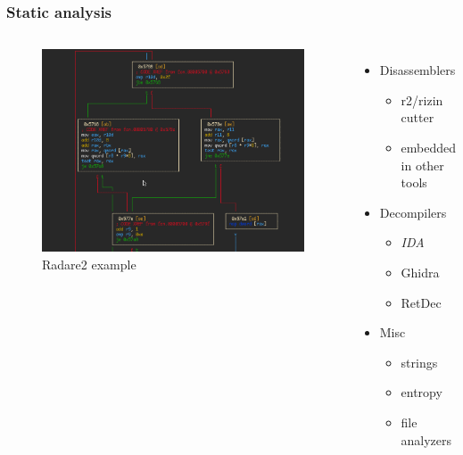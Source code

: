 \documentclass[10pt,xcolor=pdflatex]{beamer}
\begin{document}
\begin{frame}\frametitle{Static analysis}

  \begin{columns}
    \begin{figure}
      \centering
      \includegraphics[width=.8\textwidth]{../images/radare2.png}
      \caption{Radare2 example}
    \end{figure}
    \begin{itemize}
        \item Disassemblers
            \begin{itemize}
                \item r2/rizin cutter
                \item embedded in other tools
            \end{itemize}
        \item Decompilers
            \begin{itemize}
                \item \emph{IDA}
                \item Ghidra
                \item RetDec
            \end{itemize}
        \item Misc
            \begin{itemize}
                \item strings
                \item entropy
                \item file analyzers
            \end{itemize}
    \end{itemize}
  \end{columns}

\end{frame}
\end{document}
